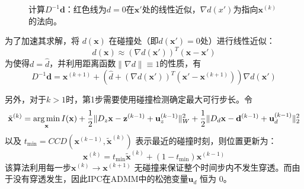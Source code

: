 \begin{figure}[hbt]
\caption{计算$D^{-1}\mathbf d$：红色线为$d = 0$在$\mathbf x'$处的线性近似，$\nabla d(x')$为指向$\mathbf x^{(k)}$的法向。}\label{fig:interpret-optimal}
\end{figure}

为了加速其求解，将 $d(\mathbf x)$ 在碰撞处（即$d (\mathbf x')= 0$处）进行线性近似：
\begin{equation}
  d(\mathbf x) \approx (\nabla d(\mathbf x') )^T (\mathbf x  - \mathbf x')
\end{equation}
为使得$d = \hat d$，并利用距离函数$\|\nabla d\| \equiv 1$的性质，有
\begin{equation}
  D^{-1}\mathbf d = \mathbf x^{(k+1)} + (\hat d + (\nabla d(\mathbf x'))^T (\mathbf x' - \mathbf x^{(k+1)}))\nabla d(\mathbf x')
\end{equation}

另外，对于$k>1$时，第1步需要使用碰撞检测确定最大可行步长。令
\begin{equation}
  \tilde{\mathbf{x}}^{(k)}=\mathop{\arg\min}\limits_{\mathbf{x}} I(\mathbf{x}) + \frac{1}{2} \| D_{z} \mathbf{x} - \mathbf{z}^{(k-1)} +\mathbf{u}_{z}^{(k-1)}\|_{W}^{2} +  \frac{1}{2} \| D_{d} \mathbf{x} - \mathbf{d}^{(k-1)} +\mathbf{u}_{d}^{(k-1)}\|_{2}^{2}
\end{equation}
以及 $t_{\min}=CCD(\mathbf{x}^{(k-1)}, \tilde {\mathbf{x}}^{(k)})$ 表示最近的碰撞时刻，则位置更新为：
\begin{equation}
  \mathbf x^{(k)} = t_{\min}\tilde{\mathbf x}^{(k)} + (1-t_{\min})\mathbf x^{(k - 1)}
\end{equation}
该算法利用每一步$\mathbf x^{(k)}\rightarrow \mathbf x^{(k+1)}$ 无碰撞来保证整个时间步内不发生穿透。而由于没有穿透发生，因此IPC在ADMM中的松弛变量$\mathbf u_d$ 恒为 0。

